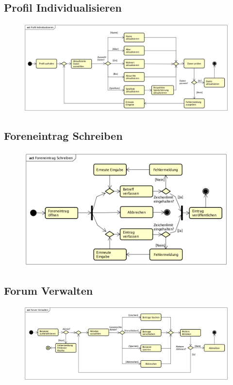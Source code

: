 \vfill

\subsection*{Profil Individualisieren}

\begin{figure}[h]
	\centering
	\includegraphics[width=0.8\linewidth]{docs/3_Aktivitaetsdiagramme/Patrick/Profil_Individualisieren.png}
	\label{fig:ActDia_Profil_Individualisieren}
\end{figure}

\vfill

\subsection*{Foreneintrag Schreiben}
\begin{figure}[h]
	\centering
	\includegraphics[width=0.8\linewidth]{docs/3_Aktivitaetsdiagramme/Patrick/Foreneintrag_Schreiben.png}
	\label{fig:ActDia_Foreneinntrag_Schreiben}
\end{figure}
\vfill

\pagebreak

\vfill

\subsection*{Forum Verwalten}
\begin{figure}[h]
	\centering
	\includegraphics[width=0.8\linewidth]{docs/3_Aktivitaetsdiagramme/Patrick/Forum_Verwalten.png}
	\label{fig:ActDia_Forum_Verwalten}
\end{figure}
